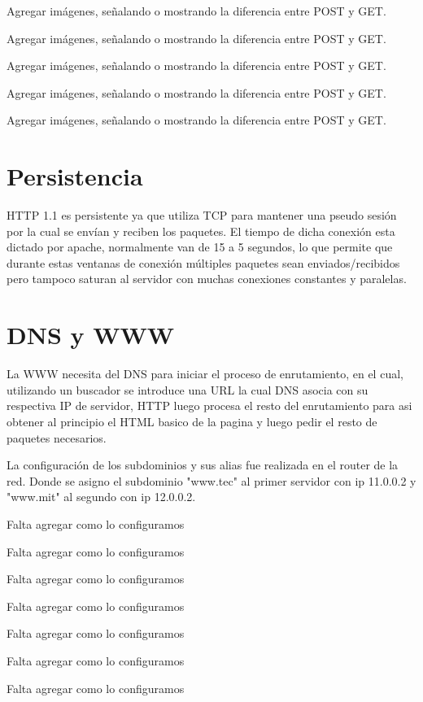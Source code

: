 \documentclass[12pt,a4paper]{article}
\begin{document}
	Agregar imágenes, señalando o mostrando la diferencia entre POST y GET.
	
	Agregar imágenes, señalando o mostrando la diferencia entre POST y GET.
	
	Agregar imágenes, señalando o mostrando la diferencia entre POST y GET.
	
	Agregar imágenes, señalando o mostrando la diferencia entre POST y GET.
	
	Agregar imágenes, señalando o mostrando la diferencia entre POST y GET.
	
	\section{Persistencia}
	HTTP 1.1 es persistente ya que utiliza TCP para mantener una pseudo sesión por la cual se envían y reciben los paquetes. El tiempo de dicha conexión esta dictado por apache, normalmente van de 15 a 5 segundos, lo que permite que durante estas ventanas de conexión múltiples paquetes sean enviados/recibidos pero tampoco saturan al servidor con muchas conexiones constantes y paralelas.
	\section{DNS y WWW}
	La WWW necesita del DNS para iniciar el proceso de enrutamiento, en el cual, utilizando un buscador se introduce una URL la cual DNS asocia con su respectiva IP de servidor, HTTP luego procesa el resto del enrutamiento para asi obtener al principio el HTML basico de la pagina y luego pedir el resto de paquetes necesarios.
	
	La configuración de los subdominios y sus alias fue realizada en el router de la red. Donde se asigno el subdominio "www.tec" al primer servidor con ip 11.0.0.2 y "www.mit" al segundo con ip 12.0.0.2.
	
	Falta agregar como  lo configuramos
	
	Falta agregar como  lo configuramos
	
	Falta agregar como  lo configuramos
	
	Falta agregar como  lo configuramos
	
	Falta agregar como  lo configuramos
	
	Falta agregar como  lo configuramos
	
	Falta agregar como  lo configuramos
	
	
\end{document}
